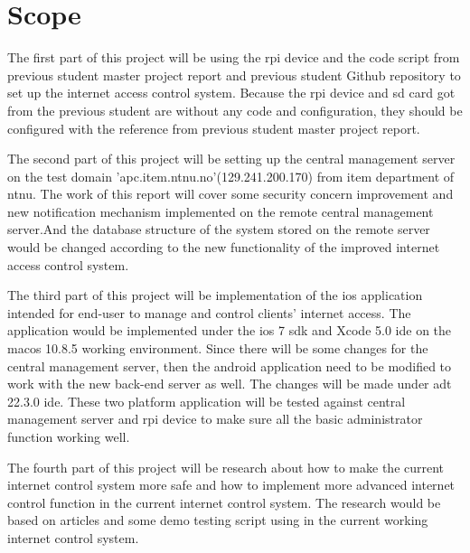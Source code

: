 \section{Scope}
\par The first part of this project will be using the \gls{rpi} device and the code script from previous student master project report\cite{TorgeirMR} and previous student Github repository\cite{TorgierGit} to set up the internet access control system. Because the \gls{rpi} device and \gls{sd} card  got from the previous student are without any code and configuration, they should be configured with the reference from previous student master project report.
\par The second part of this project will be setting up the central management server on the test domain 'apc.item.ntnu.no'(129.241.200.170)  from \gls{item} department of \gls{ntnu}. The work of this report will cover some security concern improvement and new notification mechanism implemented on the remote central management server.And the database structure of the system stored on the remote server would be changed according to the new functionality of the improved internet access control system.
\par The third part of this project will be implementation of the \gls{ios} application intended for end-user to manage and control clients’ internet access. The application would be implemented under the \gls{ios} 7 \gls{sdk} and Xcode\cite{xcode} 5.0 \gls{ide} on the \gls{macos} 10.8.5 working environment. Since there will be some changes for the central management server, then the android application need to be modified to work with the new back-end server as well. The changes will be made under \gls{adt}\cite{adt} 22.3.0 \gls{ide}. These two platform application will be tested against central management server and \gls{rpi} device to make sure all the basic administrator function working well.
\par The fourth part of this project will be research about how to make the current internet control system more safe and how to implement more advanced internet control function in the current internet control system. The research would be based on articles and some demo testing script using in the current working internet control system.

